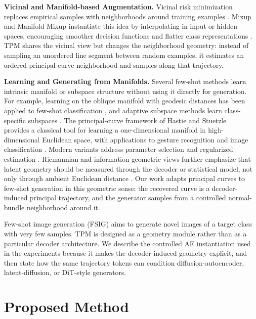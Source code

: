 \documentclass[preprint,12pt,number]{elsarticle}
\begin{document}
\textbf{Vicinal and Manifold-based Augmentation.} Vicinal risk minimization replaces empirical samples with neighborhoods around training examples \citep{chapelle2000vicinal}. Mixup and Manifold Mixup instantiate this idea by interpolating in input or hidden spaces, encouraging smoother decision functions and flatter class representations \citep{zhang2018mixup, verma2019manifoldmixup}. TPM shares the vicinal view but changes the neighborhood geometry: instead of sampling an unordered line segment between random examples, it estimates an ordered principal-curve neighborhood and samples along that trajectory.

\textbf{Learning and Generating from Manifolds.} Several few-shot methods learn intrinsic manifold or subspace structure without using it directly for generation. For example, learning on the oblique manifold with geodesic distances has been applied to few-shot classification \citep{qi2021transductive}, and adaptive subspace methods learn class-specific subspaces \citep{simon2020adaptive}. The principal-curve framework of Hastie and Stuetzle \citep{hastie1989principal} provides a classical tool for learning a one-dimensional manifold in high-dimensional Euclidean space, with applications to gesture recognition \citep{bobick1997state, chun2003markerless} and image classification \citep{chang1998principal}. Modern variants address parameter selection and regularized estimation \citep{gerber2013regularization, biau2011parameter}. Riemannian and information-geometric views further emphasize that latent geometry should be measured through the decoder or statistical model, not only through ambient Euclidean distance \citep{amari1998natural, hauberg2015principal}. Our work adapts principal curves to few-shot generation in this geometric sense: the recovered curve is a decoder-induced principal trajectory, and the generator samples from a controlled normal-bundle neighborhood around it.

Few-shot image generation (FSIG) aims to generate novel images of a target class with very few samples. TPM is designed as a geometry module rather than as a particular decoder architecture. We describe the controlled AE instantiation used in the experiments because it makes the decoder-induced geometry explicit, and then state how the same trajectory tokens can condition diffusion-autoencoder, latent-diffusion, or DiT-style generators.

\section{Proposed Method}
\end{document}
